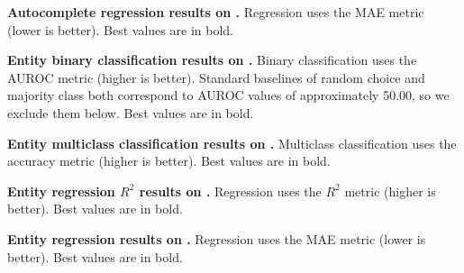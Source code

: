 \begin{table}[!ht]
  \centering
  \caption{{\bf Autocomplete regression results on \relbench.} Regression uses the MAE metric (lower is better). Best values are in bold.}
  \label{tab:autocomplete_regression_appendix}
  \renewcommand{\arraystretch}{1.1}
  \scriptsize
    \resizebox{\textwidth}{!}{
    
    }
  \vspace{10pt}
\end{table}


\begin{table}[!ht]
  \centering
  \caption{{\bf Entity binary classification results on \relbench.} Binary classification uses the AUROC metric (higher is better). Standard baselines of random choice and majority class both correspond to AUROC values of approximately 50.00, so we exclude them below. Best values are in bold.}
  \label{tab:entity_classification_appendix}
  \renewcommand{\arraystretch}{1.1}
  \scriptsize
    
  \vspace{10pt}
\end{table}

\begin{table}[!ht]
  \centering
  \caption{{\bf Entity multiclass classification results on \relbench.} Multiclass classification uses the accuracy metric (higher is better). Best values are in bold.}
  \label{tab:entity_multiclass_appendix}
  \renewcommand{\arraystretch}{1.1}
  \scriptsize
    
  \vspace{10pt}
\end{table}

\begin{table}[!ht]
  \centering
  \caption{{\bf Entity regression $R^2$ results on \relbench.} Regression uses the $R^2$ metric (higher is better). Best values are in bold.}
  \label{tab:entity_regression_r2_appendix}
  \renewcommand{\arraystretch}{1.1}
  \scriptsize
    \resizebox{\textwidth}{!}{
    
    }
  \vspace{10pt}
\end{table}

\begin{table}[!ht]
  \centering
  \caption{{\bf Entity regression results on \relbench.} Regression uses the MAE metric (lower is better). Best values are in bold.}
  \label{tab:entity_regression_appendix}
  \renewcommand{\arraystretch}{1.1}
  \scriptsize
    \resizebox{\textwidth}{!}{
    
    }
  \vspace{10pt}
\end{table}



